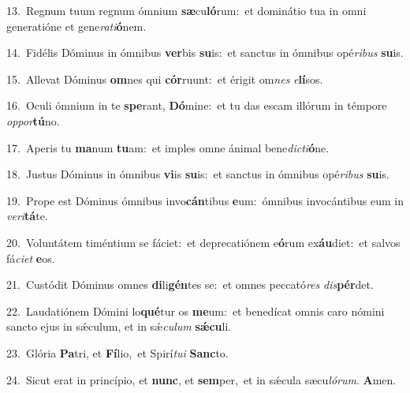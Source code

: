 {\numbfont\textcolor{\numbcolor}{13.}}~Regnum tuum regnum ómnium \textbf{sæ}\-cu\-\textbf{ló}\-rum:~\star et dominátio tua in omni generatióne et gene\-\textit{ra}\-\textit{ti}\textbf{ó}nem.\par
{\numbfont\textcolor{\numbcolor}{14.}}~Fidélis Dóminus in ómnibus \textbf{ver}\-bis \textbf{su}\-is:~\star et sanctus in ómnibus opé\-\textit{ri}\-\textit{bus} \textbf{su}\-is.\par
{\numbfont\textcolor{\numbcolor}{15.}}~Allevat Dóminus \textbf{om}\-nes qui \textbf{cór}\-ruunt:~\star et érigit om\textit{nes} \textit{e}\-\textbf{lí}sos.\par
{\numbfont\textcolor{\numbcolor}{16.}}~Oculi ómnium in te \textbf{spe}\-rant, \textbf{Dó}\-mine:~\star et tu das escam illórum in témpore \textit{op}\-\textit{por}\textbf{tú}no.\par
{\numbfont\textcolor{\numbcolor}{17.}}~Aperis tu \textbf{ma}\-num \textbf{tu}\-am:~\star et imples omne ánimal bene\-\textit{dic}\-\textit{ti}\textbf{ó}ne.\par
{\numbfont\textcolor{\numbcolor}{18.}}~Justus Dóminus in ómnibus \textbf{vi}\-is \textbf{su}\-is:~\star et sanctus in ómnibus opé\-\textit{ri}\-\textit{bus} \textbf{su}\-is.\par
{\numbfont\textcolor{\numbcolor}{19.}}~Prope est Dóminus ómnibus invo\-\textbf{cán}\-tibus \textbf{e}\-um:~\star ómnibus invocántibus eum in \textit{ve}\-\textit{ri}\textbf{tá}te.\par
{\numbfont\textcolor{\numbcolor}{20.}}~Voluntátem timéntium se fáciet:~\dagger et deprecatiónem e\-\textbf{ó}\-rum ex\-\textbf{áu}\-diet:~\star et salvos fá\-\textit{ci}\-\textit{et} \textbf{e}\-os.\par
{\numbfont\textcolor{\numbcolor}{21.}}~Custódit Dóminus omnes \textbf{di}\-li\-\textbf{gén}\-tes se:~\star et omnes peccató\textit{res} \textit{dis}\-\textbf{pér}det.\par
{\numbfont\textcolor{\numbcolor}{22.}}~Laudatiónem Dómini lo\-\textbf{qué}\-tur os \textbf{me}\-um:~\star et benedícat omnis caro nómini sancto ejus in sǽculum, et in sǽ\-\textit{cu}\-\textit{lum} \textbf{sǽ}\-\textbf{cu}li.\par
{\numbfont\textcolor{\numbcolor}{23.}}~Glória \textbf{Pa}\-tri, et \textbf{Fí}\-lio,~\star et Spirí\-\textit{tu}\-\textit{i} \textbf{Sanc}\-to.\par
{\numbfont\textcolor{\numbcolor}{24.}}~Sicut erat in princípio, et \textbf{nunc}\-, et \textbf{sem}\-per,~\star et in sǽcula sæcu\-\textit{ló}\-\textit{rum}. \textbf{A}\-men.\par
